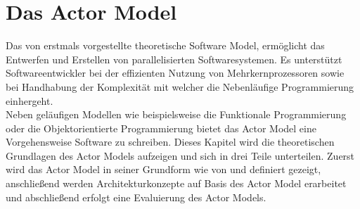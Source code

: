 \chapter{Das Actor Model}
Das von \cite{hewitt1973session} erstmals vorgestellte theoretische Software Model, ermöglicht das Entwerfen und Erstellen von parallelisierten Softwaresystemen. Es unterstützt Softwareentwickler bei der effizienten Nutzung von Mehrkernprozessoren sowie bei Handhabung der  Komplexität mit welcher die Nebenläufige Programmierung einhergeht.   
\\
Neben geläufigen Modellen wie beispielsweise die Funktionale Programmierung oder die Objektorientierte Programmierung bietet das Actor Model eine Vorgehensweise Software zu schreiben. Dieses Kapitel wird die theoretischen Grundlagen des Actor Models aufzeigen und sich in drei Teile unterteilen. Zuerst wird das Actor Model in seiner Grundform wie von \cite{hewitt1973session} und \cite{Agha1985ActorsSystems} definiert gezeigt, anschließend werden Architekturkonzepte auf Basis des Actor Model erarbeitet und abschließend erfolgt eine Evaluierung des Actor Models.



